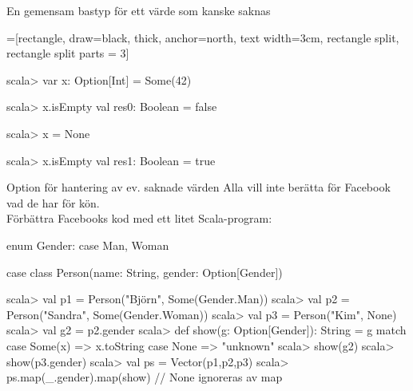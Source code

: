 \begin{Slide}{En gemensam bastyp för ett värde som kanske saknas}\SlideFontSmall\ifkompendium\footnotesize\fi
\vspace{-0.0em}\begin{center}
\newcommand{\TextBox}[1]{\raisebox{0pt}[1em][0.5em]{#1}}
=[rectangle, draw=black,  thick, anchor=north, text width=3cm, rectangle split, rectangle split parts = 3]
\end{center}
\pause
\vspace{-0.5em}\begin{REPL}
scala> var x: Option[Int] = Some(42)

scala> x.isEmpty
val res0: Boolean = false

scala> x = None

scala> x.isEmpty
val res1: Boolean = true
\end{REPL}
\end{Slide}


\begin{Slide}{Option för hantering av ev. saknade värden}\SlideFontSmall
Alla vill inte berätta för Facebook vad de har för kön. \\ Förbättra Facebooks kod med ett litet Scala-program:
\begin{Code}
enum Gender:
  case Man, Woman

case class Person(name: String, gender: Option[Gender])
\end{Code}
\pause
\begin{REPL}
scala> val p1 = Person("Björn",  Some(Gender.Man))
scala> val p2 = Person("Sandra", Some(Gender.Woman))
scala> val p3 = Person("Kim",  None)
scala> val g2 = p2.gender
scala> def show(g: Option[Gender]): String = g match {
         case Some(x) => x.toString
         case None    => "unknown"
       }
scala> show(g2)
scala> show(p3.gender)
scala> val ps = Vector(p1,p2,p3)
scala> ps.map(_.gender).map(show)   // None ignoreras av map
\end{REPL}
\end{Slide}

